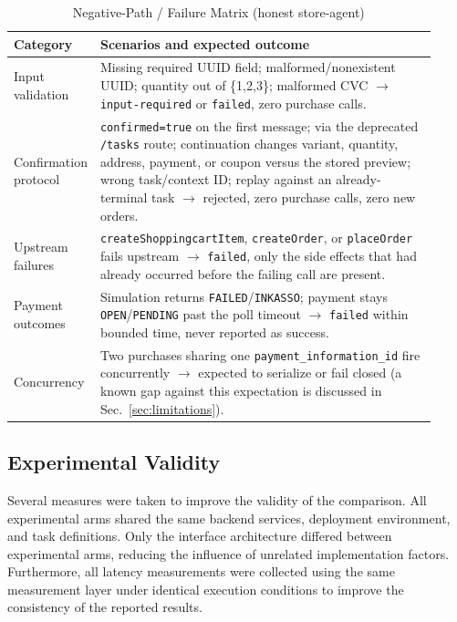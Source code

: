 \documentclass[conference]{IEEEtran}
\begin{document}
\begin{table}[t]
\caption{Negative-Path / Failure Matrix (honest store-agent)}
\label{tab:negpath}
\centering
\begin{tabular}{@{}p{0.10\linewidth}p{0.82\linewidth}@{}}
\toprule
\textbf{Category} & \textbf{Scenarios and expected outcome} \\
\midrule
Input validation & Missing required UUID field; malformed/nonexistent UUID;
  quantity out of \{1,2,3\}; malformed CVC $\rightarrow$
  \texttt{input-required} or \texttt{failed}, zero purchase calls. \\
Confirmation protocol & \texttt{confirmed=true} on the first message; via the
  deprecated \texttt{/tasks} route; continuation changes variant, quantity,
  address, payment, or coupon versus the stored preview; wrong
  task/context ID; replay against an already-terminal task $\rightarrow$
  rejected, zero purchase calls, zero new orders. \\
Upstream failures & \texttt{createShoppingcartItem}, \texttt{createOrder}, or
  \texttt{placeOrder} fails upstream $\rightarrow$ \texttt{failed}, only the
  side effects that had already occurred before the failing call are
  present. \\
Payment outcomes & Simulation returns \texttt{FAILED}/\texttt{INKASSO};
  payment stays \texttt{OPEN}/\texttt{PENDING} past the poll timeout
  $\rightarrow$ \texttt{failed} within bounded time, never reported as
  success. \\
Concurrency & Two purchases sharing one \texttt{payment\_information\_id}
  fire concurrently $\rightarrow$ expected to serialize or fail closed (a
  known gap against this expectation is discussed in
  Sec.~\ref{sec:limitations}). \\
\bottomrule
\end{tabular}
\end{table}

\subsection{Experimental Validity}

Several measures were taken to improve the validity of the comparison. All
experimental arms shared the same backend services, deployment environment,
and task definitions. Only the interface architecture differed between
experimental arms, reducing the influence of unrelated implementation
factors. Furthermore, all latency measurements were collected using the same
measurement layer under identical execution conditions to improve the
consistency of the reported results.
\end{document}
